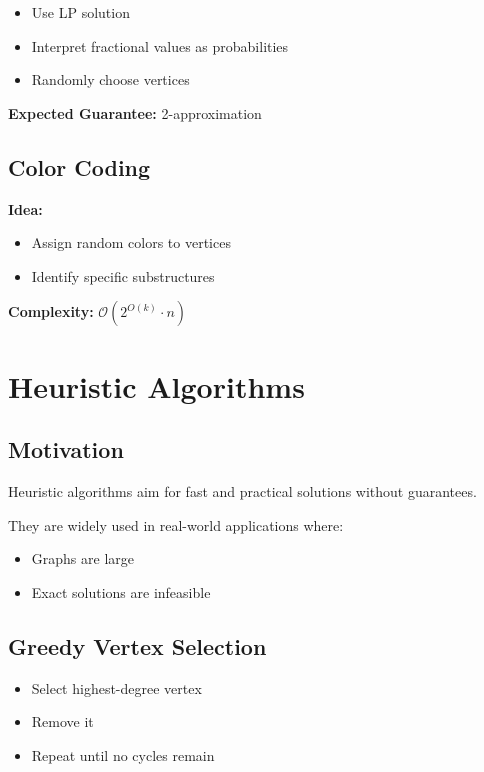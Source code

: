 \documentclass[10pt,a4paper]{report}
\theoremstyle{definition}
\newcommand{\bigO}[1]{\mathcal{O}\!\left(#1\right)}
\begin{document}
\begin{itemize}
  \item Use LP solution
  \item Interpret fractional values as probabilities
  \item Randomly choose vertices
\end{itemize}

\textbf{Expected Guarantee:} 2-approximation

\subsection{Color Coding}

\textbf{Idea:}
\begin{itemize}
  \item Assign random colors to vertices
  \item Identify specific substructures
\end{itemize}

\textbf{Complexity:} $\bigO{2^{O(k)} \cdot n}$

\section{Heuristic Algorithms}

\subsection{Motivation}

Heuristic algorithms aim for fast and practical solutions without guarantees.

They are widely used in real-world applications where:
\begin{itemize}
  \item Graphs are large
  \item Exact solutions are infeasible
\end{itemize}

\subsection{Greedy Vertex Selection}

\begin{itemize}
  \item Select highest-degree vertex
  \item Remove it
  \item Repeat until no cycles remain
\end{itemize}
\end{document}
